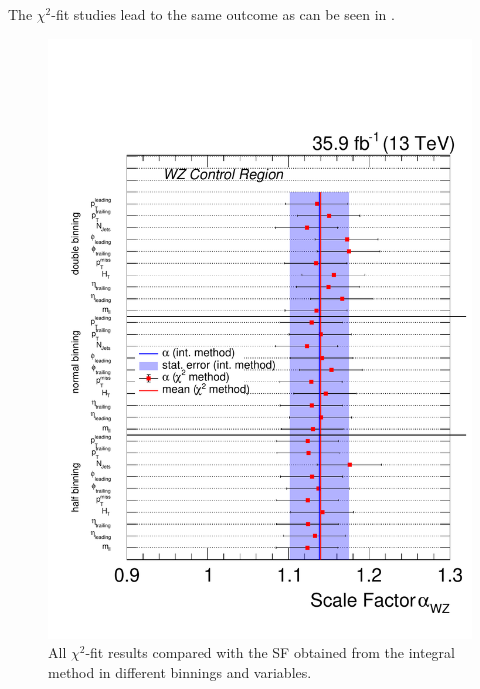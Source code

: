 The $\chi^2$-fit studies lead to the same outcome as can be seen in .

\begin{figure}[tbp]
 \centering
 \includegraphics[width=\pairwidth]{figures/plots_CR/chi/WZ_Compare}
 \caption{All $\chi^2$-fit results compared with the SF obtained from the integral method in different binnings and variables.}
 \label{fig:chiWZ}
\end{figure}




